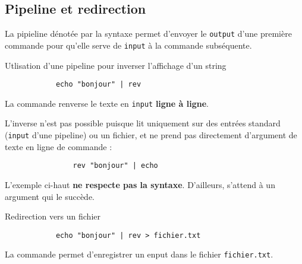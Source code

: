 \documentclass[a4paper]{report}
\begin{document}
    \subsection{Pipeline et redirection}
    \begin{Concept}[Pipeline]
        La pipieline dénotée par la syntaxe  permet d'envoyer
        le \texttt{output} d'une première commande pour qu'elle serve de 
        \texttt{input} à la commande subséquente.   
            
    \end{Concept}

    \begin{EExample}{Utlisation d'une pipeline pour inverser l'affichage d'un string}{}
        \begin{center}
        \begin{verbatim}
            echo "bonjour" | rev
        \end{verbatim}
        \end{center}
        La commande  renverse le texte en \texttt{input} 
        \textbf{ligne à ligne}.   
    \end{EExample}

    \begin{note}{}{}
        L'inverse n'est pas possible puisque 
         lit uniquement 
        sur des entrées standard (\texttt{input} d'une pipeline) ou un fichier, et ne prend pas 
        directement d'argument de texte en ligne de commande : 
        \begin{center}
            \begin{verbatim}
                rev "bonjour" | echo
            \end{verbatim}
        \end{center}
        L'exemple ci-haut \textbf{ne respecte pas la syntaxe}. D'ailleurs,  
         s'attend à un argument qui le succède.
    \end{note}

    \begin{EExample}{Redirection vers un fichier}{}
        \begin{verbatim}
            echo "bonjour" | rev > fichier.txt
        \end{verbatim}
        La commande  permet d'enregistrer 
        un enput dans le fichier \texttt{fichier.txt}.   
    \end{EExample}
\end{document}
